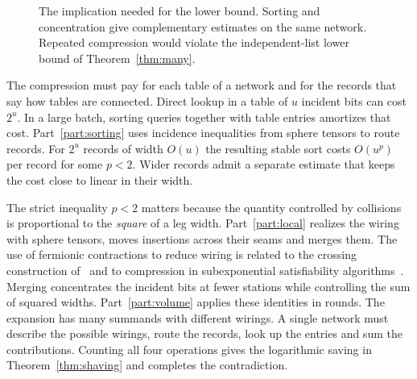 \begin{figure}[!htbp]
\centering
{}
\caption{The implication needed for the lower bound. Sorting and
concentration give complementary estimates on the same network.
Repeated compression would violate the independent-list lower bound
of Theorem~\ref{thm:many}.}\label{fig:org}
\end{figure}

The compression must pay for each table of a network and for the
records that say how tables are connected. Direct lookup in a table
of \(u\) incident bits can cost \(2^u\). In a large batch, sorting
queries together with table entries amortizes that cost. Part~\ref{part:sorting}
uses incidence inequalities from sphere tensors to route records.
For \(2^u\) records of width \(O(u)\) the resulting stable sort costs
\(O(u^p)\) per record for some \(p<2\). Wider records admit a separate
estimate that keeps the cost close to linear in their width.

The strict inequality \(p<2\) matters because the quantity controlled
by collisions is proportional to the \emph{square} of a leg width.
Part~\ref{part:local} realizes the wiring with sphere tensors, moves
insertions across their seams and merges them. The use of fermionic contractions to reduce wiring is
related to the crossing construction of~\cite{Khoruzhii,oaG} and to
compression in subexponential satisfiability algorithms~\cite{falseeth,Anthropic}.
Merging concentrates the
incident bits at fewer stations while controlling the sum of squared
widths. Part~\ref{part:volume} applies these identities in rounds.
The expansion has many summands with different wirings. A single
network must describe the possible wirings, route the records, look
up the entries and sum the contributions. Counting all four operations
gives the logarithmic saving in Theorem~\ref{thm:shaving} and completes
the contradiction.


